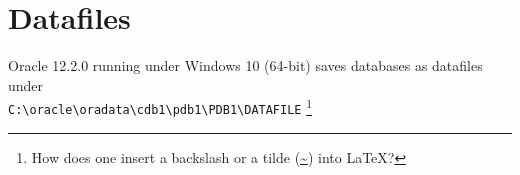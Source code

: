 
\newpage
\setcounter{secnumdepth}{0}
\section{Datafiles}

Oracle 12.2.0 running under Windows 10 (64-bit) saves databases as
datafiles under\\
 \texttt{C:\textbackslash oracle\textbackslash oradata\textbackslash cdb1\textbackslash pdb1\textbackslash PDB1\textbackslash DATAFILE}
\footnote{How does one insert a backslash or a tilde (\url{~}) into LaTeX?}
